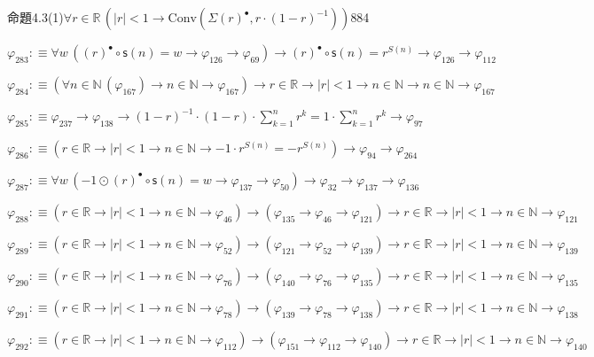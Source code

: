 \begin{fullproof}{命題4.3(1)}{$\forall r \in \mathbb{R}\,(\lvert r \rvert < 1 \to \mathrm{Conv}(\Sigma {(r)^{\bullet}},r \cdot (1 - r)^{-1}))$}{884}
\begin{abbrevlist}
\item $\varphi_{283} :\equiv \forall w\,({(r)^{\bullet}} \circ \mathsf{s}(n) = w \to \varphi_{126} \to \varphi_{69}) \to {(r)^{\bullet}} \circ \mathsf{s}(n) = {{r}^{S(n)}} \to \varphi_{126} \to \varphi_{112}$
\item $\varphi_{284} :\equiv (\forall n \in \mathbb{N}\,(\varphi_{167}) \to n \in \mathbb{N} \to \varphi_{167}) \to r \in \mathbb{R} \to \lvert r \rvert < 1 \to n \in \mathbb{N} \to n \in \mathbb{N} \to \varphi_{167}$
\item $\varphi_{285} :\equiv \varphi_{237} \to \varphi_{138} \to (1 - r)^{-1} \cdot (1 - r) \cdot {\textstyle\sum_{k=1}^{n} {{r}^{k}}} = 1 \cdot {\textstyle\sum_{k=1}^{n} {{r}^{k}}} \to \varphi_{97}$
\item $\varphi_{286} :\equiv (r \in \mathbb{R} \to \lvert r \rvert < 1 \to n \in \mathbb{N} \to -1 \cdot {{r}^{S(n)}} = -{{r}^{S(n)}}) \to \varphi_{94} \to \varphi_{264}$
\item $\varphi_{287} :\equiv \forall w\,(-1 \odot {(r)^{\bullet}} \circ \mathsf{s}(n) = w \to \varphi_{137} \to \varphi_{50}) \to \varphi_{32} \to \varphi_{137} \to \varphi_{136}$
\item $\varphi_{288} :\equiv (r \in \mathbb{R} \to \lvert r \rvert < 1 \to n \in \mathbb{N} \to \varphi_{46}) \to (\varphi_{135} \to \varphi_{46} \to \varphi_{121}) \to r \in \mathbb{R} \to \lvert r \rvert < 1 \to n \in \mathbb{N} \to \varphi_{121}$
\item $\varphi_{289} :\equiv (r \in \mathbb{R} \to \lvert r \rvert < 1 \to n \in \mathbb{N} \to \varphi_{52}) \to (\varphi_{121} \to \varphi_{52} \to \varphi_{139}) \to r \in \mathbb{R} \to \lvert r \rvert < 1 \to n \in \mathbb{N} \to \varphi_{139}$
\item $\varphi_{290} :\equiv (r \in \mathbb{R} \to \lvert r \rvert < 1 \to n \in \mathbb{N} \to \varphi_{76}) \to (\varphi_{140} \to \varphi_{76} \to \varphi_{135}) \to r \in \mathbb{R} \to \lvert r \rvert < 1 \to n \in \mathbb{N} \to \varphi_{135}$
\item $\varphi_{291} :\equiv (r \in \mathbb{R} \to \lvert r \rvert < 1 \to n \in \mathbb{N} \to \varphi_{78}) \to (\varphi_{139} \to \varphi_{78} \to \varphi_{138}) \to r \in \mathbb{R} \to \lvert r \rvert < 1 \to n \in \mathbb{N} \to \varphi_{138}$
\item $\varphi_{292} :\equiv (r \in \mathbb{R} \to \lvert r \rvert < 1 \to n \in \mathbb{N} \to \varphi_{112}) \to (\varphi_{151} \to \varphi_{112} \to \varphi_{140}) \to r \in \mathbb{R} \to \lvert r \rvert < 1 \to n \in \mathbb{N} \to \varphi_{140}$

\end{abbrevlist}
\end{fullproof}
